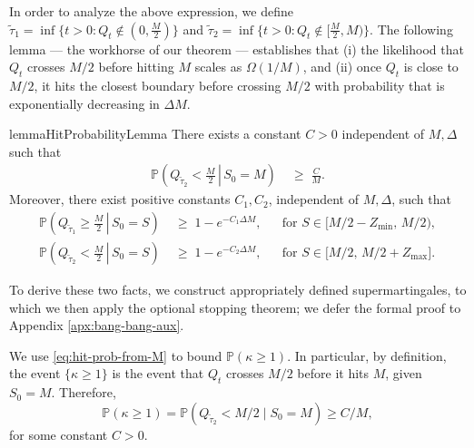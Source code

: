 \documentclass[mnsc,nonblindrev]{informs3}
\newcommand{\pr}{\mathbb{P}}
\renewcommand{\Pr}{\pr}
\newcommand{\Ttaulow}{\widetilde{\tau}_1}
\newcommand{\Ttauhigh}{\widetilde{\tau}_2}
\renewenvironment{proof}[1][Proof]{%
  \par\noindent{\itshape #1.} \ignorespaces
}{%
  \hfill\Halmos\par
}
\begin{document}
\begin{proof}[Proof]
In order to analyze the above expression, we define $\Ttaulow = \inf\{t > 0: Q_t \not\in (0, \frac{M}{2})\}$ and $\Ttauhigh = \inf\{t > 0: Q_t \not\in [ \frac{M}{2}, M)\}$. The following lemma --- the workhorse of our theorem --- establishes that (i) the likelihood that $Q_t$ crosses $M/2$ before hitting $M$ scales as $\Omega(1/M)$, and (ii) once $Q_t$ is close to $M/2$, it hits the closest boundary before crossing $M/2$ with probability that is exponentially decreasing in $\Delta M$. 

\begin{restatable}{lemma}{HitProbabilityLemma}\label{lem:bound_on_hit_probabilities}
There exists a constant $C > 0$ independent of $M, \Delta$ such that
\begin{align}
\pr\!\left(\left. Q_{\Ttauhigh} < \frac{M}{2}\,\right|\, S_0=M\right)
&\;\ge\; \frac{C}{M}. \label{eq:hit-prob-from-M}
\end{align}
Moreover, there exist positive constants $C_1, C_2$, independent 
of $M, \Delta$, such that
\begin{align}
\pr\!\left(\left. Q_{\Ttaulow} \ge \frac{M}{2}\,\right|\, S_0=S\right)
&\;\ge\; 1 -  e^{-C_1\Delta M},
&&\text{for } S \in \bigl[M/2 - Z_{\min},\, M/2\bigr), \label{eq:hit-prob-below} \\
\pr\!\left(\left. Q_{\Ttauhigh} < \frac{M}{2}\,\right|\, S_0=S\right)
&\;\ge\; 1 - e^{-C_2\Delta M},
&&\text{for } S \in \bigl[M/2,\, M/2 + Z_{\max}\bigr] \label{eq:hit-prob-above}.
\end{align}
\end{restatable}

To derive these two facts, we construct appropriately defined supermartingales, to which we then apply the optional stopping theorem; we defer the formal proof to Appendix \ref{apx:bang-bang-aux}. 

We use \cref{eq:hit-prob-from-M} to bound $\Pr(\kappa \geq 1)$. In particular, by definition, the event $\{\kappa \geq 1\}$ is the event that $Q_t$ crosses $M/2$ before it hits $M$, given $S_0 = M$. Therefore, 
\[\Pr(\kappa \geq 1) = \Pr\left(Q_{\Ttauhigh} < M/2 \mid S_0 = M\right) \geq C/M,\] 
for some constant $C > 0$.


\end{proof}
\end{document}
